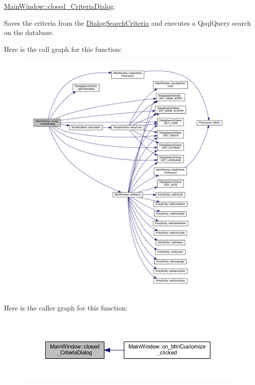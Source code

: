 \hyperlink{class_main_window_a097083ebf975108934ad8d9c6fdd3f3f}{Main\+Window\+::closed\+\_\+\+Criteria\+Dialog}. 

Saves the criteria from the \hyperlink{class_dialog_search_criteria}{Dialog\+Search\+Criteria} and executes a Qsql\+Query search on the database. 

Here is the call graph for this function\+:
\nopagebreak
\begin{figure}[H]
\begin{center}
\leavevmode
\includegraphics[width=350pt]{class_main_window_a097083ebf975108934ad8d9c6fdd3f3f_cgraph}
\end{center}
\end{figure}




Here is the caller graph for this function\+:
\nopagebreak
\begin{figure}[H]
\begin{center}
\leavevmode
\includegraphics[width=350pt]{class_main_window_a097083ebf975108934ad8d9c6fdd3f3f_icgraph}
\end{center}
\end{figure}


